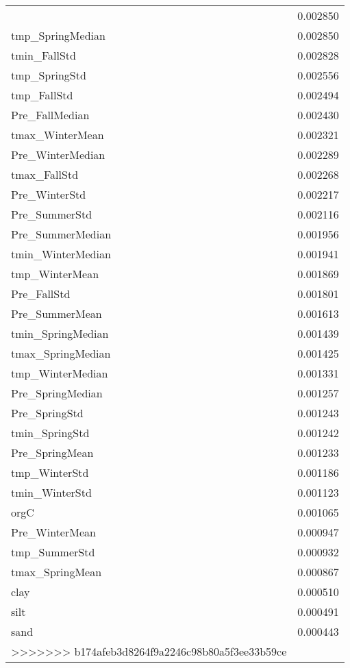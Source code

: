 \begin{tabular}{lr}
\begin{tabular}{rrrrr}
tmin_SummerStd & 0.002850 \\
tmp_SpringMedian & 0.002850 \\
tmin_FallStd & 0.002828 \\
tmp_SpringStd & 0.002556 \\
tmp_FallStd & 0.002494 \\
Pre_FallMedian & 0.002430 \\
tmax_WinterMean & 0.002321 \\
Pre_WinterMedian & 0.002289 \\
tmax_FallStd & 0.002268 \\
Pre_WinterStd & 0.002217 \\
Pre_SummerStd & 0.002116 \\
Pre_SummerMedian & 0.001956 \\
tmin_WinterMedian & 0.001941 \\
tmp_WinterMean & 0.001869 \\
Pre_FallStd & 0.001801 \\
Pre_SummerMean & 0.001613 \\
tmin_SpringMedian & 0.001439 \\
tmax_SpringMedian & 0.001425 \\
tmp_WinterMedian & 0.001331 \\
Pre_SpringMedian & 0.001257 \\
Pre_SpringStd & 0.001243 \\
tmin_SpringStd & 0.001242 \\
Pre_SpringMean & 0.001233 \\
tmp_WinterStd & 0.001186 \\
tmin_WinterStd & 0.001123 \\
orgC & 0.001065 \\
Pre_WinterMean & 0.000947 \\
tmp_SummerStd & 0.000932 \\
tmax_SpringMean & 0.000867 \\
clay & 0.000510 \\
silt & 0.000491 \\
sand & 0.000443 \\
>>>>>>> b174afeb3d8264f9a2246c98b80a5f3ee33b59ce
\bottomrule
\end{tabular}
